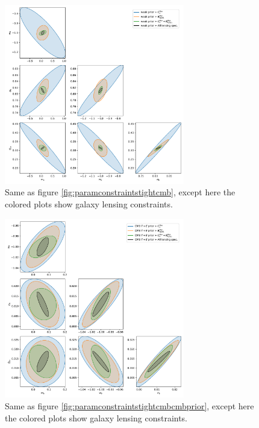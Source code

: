 \documentclass[11pt]{article} %
\begin{document}
\begin{figure}
    \centering
    \includegraphics[width=0.7\textwidth]{figures/param_constraints_tight_gal_weak_prior.pdf}
    \caption{Same as figure \ref{fig:paramconstraintstightcmb}, except here the colored plots show galaxy lensing constraints.}
    \label{fig:paramconstraintstightgal}
\end{figure}

\begin{figure}
    \centering
    \includegraphics[width=0.7\textwidth]{figures/param_constraints_tight_gal_cmb_prior.pdf}
    \caption{Same as figure \ref{fig:paramconstraintstightcmbcmbprior}, except here the colored plots show galaxy lensing constraints.}
    \label{fig:paramconstraintstightgalcmbprior}
\end{figure}
\end{document}
